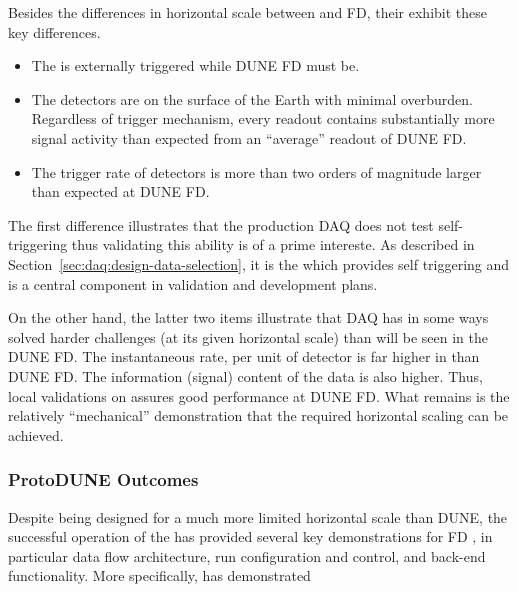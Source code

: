 Besides the differences in horizontal scale between 
and  FD, their  exhibit these key differences. 
\begin{itemize}
\item The   is externally triggered while
  DUNE FD must be. 
\item The  detectors are on the surface of the Earth
  with minimal overburden. 
  Regardless of trigger mechanism, every readout contains substantially
  more signal activity than expected from an ``average'' readout of DUNE
  FD.
\item The trigger rate of  detectors is more than two
  orders of magnitude larger than expected at DUNE FD.
\end{itemize}

The first difference illustrates that the production 
DAQ does not test self-triggering thus validating this ability is of a
prime intereste.
As described in Section~\ref{sec:daq:design-data-selection}, it is the
 which provides self triggering and is a central component
in validation and development plans.
 
On the other hand, the latter two items illustrate that
 DAQ has in some ways solved harder challenges (at its
given horizontal scale) than will be seen in the DUNE FD. 
The instantaneous rate, per unit of detector is far higher in
 than DUNE FD. 
The information (signal) content of the data is also higher. 
Thus, local validations on  assures good performance at
DUNE FD. 
What remains is the relatively ``mechanical'' demonstration that the
required horizontal scaling can be achieved.  

\subsubsection{ProtoDUNE Outcomes}

Despite being designed for a much more limited horizontal scale than
DUNE, the successful operation of the   has
provided several key demonstrations for  FD , in
particular data flow architecture, run configuration and control, and
back-end functionality.
More specifically,  has demonstrated

